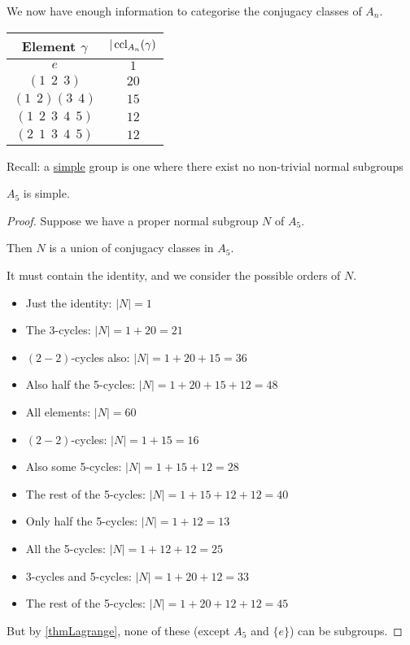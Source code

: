 \documentclass[../Main.tex]{subfiles}
\begin{document}
\begin{example}
\begin{itemize}
    \end{itemize}
    We now have enough information to categorise the conjugacy classes of $A_n$.\par
    \begin{tabular}{c|c}
        Element $\gamma$ & $|\operatorname{ccl}_{A_n}(\gamma)$ \\
        \hline
        $e$ & $1$ \\
        $(1~~2~~3)$ & $20$ \\
        $(1~~2)(3~~4)$ & $15$ \\
        $(1~~2~~3~~4~~5)$ & $12$ \\
        $(2~~1~~3~~4~~5)$ & $12$
    \end{tabular}
\end{example}
Recall: a \underline{simple} group is one where there exist no non-trivial normal subgroups\par %
\begin{theorem}
    $A_5$ is simple. \label{thmA5Simple}
\end{theorem}
\begin{proof}
    Suppose we have a proper normal subgroup $N$ of $A_5$.\par
    Then $N$ is a union of conjugacy classes in $A_5$.\par
    It must contain the identity, and we consider the possible orders of $N$.
    \begin{itemize}
        \item Just the identity: $|N| = 1$
        \item The 3-cycles: $|N| = 1+20=21$
        \item $(2-2)$-cycles also: $|N| = 1+20+15 = 36$
        \item Also half the 5-cycles: $|N| = 1+20+15+12=48$
        \item All elements: $|N| = 60$
        \item $(2-2)$-cycles: $|N| = 1+15 = 16$
        \item Also some 5-cycles: $|N| = 1+15+12 = 28$
        \item The rest of the 5-cycles: $|N| = 1+15+12+12 = 40$
        \item Only half the 5-cycles: $|N| = 1+12 = 13$
        \item All the 5-cycles: $|N| = 1+12+12 = 25$
        \item 3-cycles and 5-cycles: $|N| = 1+20+12 = 33$
        \item The rest of the 5-cycles: $|N| = 1+20+12+12 = 45$
    \end{itemize}
    But by \ref{thmLagrange}, none of these (except $A_5$ and $\{e\}$) can be subgroups.
\end{proof}
\end{document}
